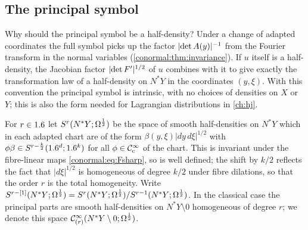 \subsection{The principal symbol}
\begin{discussion}
  Why should the principal symbol be a half-density? Under a change of
  adapted coordinates the full symbol picks up the factor
  $\lvert \det A(y)\rvert^{-1}$ from the Fourier transform in the normal variables
  (\cref{conormal:thm:invariance}). If $u$ itself is a half-density, the
  Jacobian factor $\lvert \det F'\rvert^{1/2}$ of $u$ combines with it to give
  exactly the transformation law of a half-density on $N^*Y$ in the
  coordinates $(y,\xi)$. With this convention the principal symbol is
  intrinsic, with no choices of densities on $X$ or $Y$; this is also the
  form needed for Lagrangian distributions in \cref{ch:hj}.
\end{discussion}

For $r\in1.6$ let $S^r(N^*Y;\Omega^{\frac12})$ be the space of smooth half-densities on
$N^*Y$ which in each adapted chart are of the form $\beta(y,\xi)|dy\,d\xi|^{1/2}$
with $\phi\beta\in S^{r-\frac k2}(1.6^d;1.6^k)$ for all $\phi\in\mathcal{C}^\infty_{\mathrm{c}}$ of the chart.
This is invariant under the fibre-linear maps \eqref{conormal:eq:Fsharp}, so is
well defined; the shift by $k/2$ reflects the fact that $|d\xi|^{1/2}$ is
homogeneous of degree $k/2$ under fibre dilations, so that the order $r$ is the
total homogeneity.  Write
$S^{r-[1]}(N^*Y;\Omega^{\frac12})=S^r(N^*Y;\Omega^{\frac12})/S^{r-1}(N^*Y;\Omega^{\frac12})$.  In the
classical case the principal parts are smooth half-densities on
$N^*Y\setminus0$ homogeneous of degree $r$; we denote this space
$\mathcal{C}^\infty_{(r)}(N^*Y\setminus0;\Omega^{\frac12})$.

